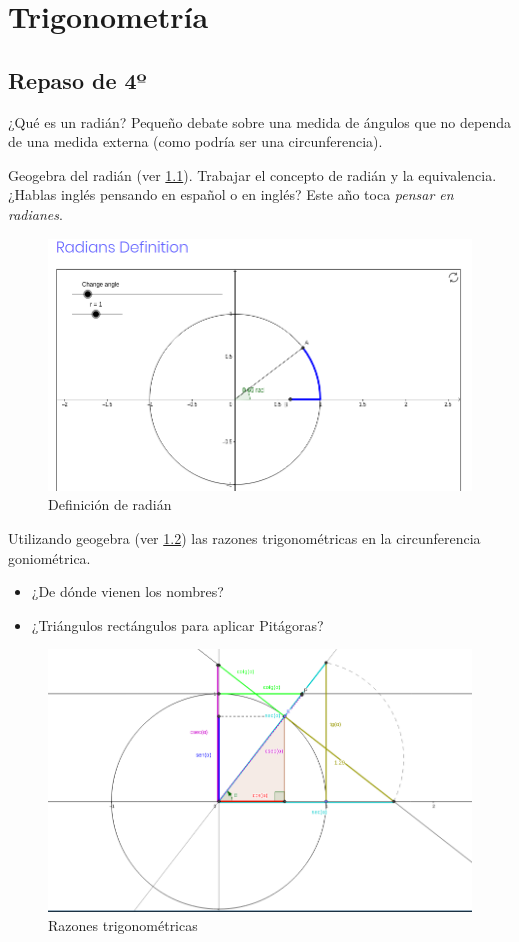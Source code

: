 \chapter{Trigonometría}


\section{Repaso de 4º}

¿Qué es un radián? Pequeño debate sobre una medida de ángulos que no dependa de una medida externa (como podría ser una circunferencia).

Geogebra del radián (ver \ref{img:radian}). Trabajar el concepto de radián y la equivalencia. ¿Hablas inglés pensando en español o en inglés? Este año toca \textit{pensar en radianes}.

\begin{figure}
\centering
\includegraphics[scale=0.5]{img/Trigon1}
\caption{Definición de radián}
\label{img:radian}
\end{figure}

Utilizando geogebra (ver \ref{img:razones}) las razones trigonométricas en la circunferencia goniométrica. 
\begin{itemize}
	\item ¿De dónde vienen los nombres? 
	\item ¿Triángulos rectángulos para aplicar Pitágoras?
\end{itemize}

\begin{figure}
\centering
\includegraphics[scale=0.5]{img/Trigon2}
\caption{Razones trigonométricas}
\label{img:razones}
\end{figure}


